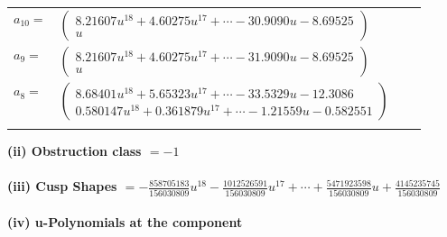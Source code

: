\documentclass[1p]{elsarticle_modified}
\theoremstyle{definition}
\begin{document}
\begin{tabular}{m{7pt} m{180pt} m{7pt} m{180pt} }
\flushright $a_{10}=$&$\begin{pmatrix}8.21607 u^{18}+4.60275 u^{17}+\cdots-30.9090 u-8.69525\\u\end{pmatrix}$ \\
\flushright $a_{9}=$&$\begin{pmatrix}8.21607 u^{18}+4.60275 u^{17}+\cdots-31.9090 u-8.69525\\u\end{pmatrix}$ \\
\flushright $a_{8}=$&$\begin{pmatrix}8.68401 u^{18}+5.65323 u^{17}+\cdots-33.5329 u-12.3086\\0.580147 u^{18}+0.361879 u^{17}+\cdots-1.21559 u-0.582551\end{pmatrix}$\\&\end{tabular}
\flushleft \textbf{(ii) Obstruction class $= -1$}\\~\\
\flushleft \textbf{(iii) Cusp Shapes $= -\frac{858705183}{156030809} u^{18}-\frac{1012526591}{156030809} u^{17}+\cdots+\frac{5471923598}{156030809} u+\frac{4145235745}{156030809}$}\\~\\
\newpage\renewcommand{\arraystretch}{1}
\flushleft \textbf{(iv) u-Polynomials at the component}\newline \\
\end{document}
